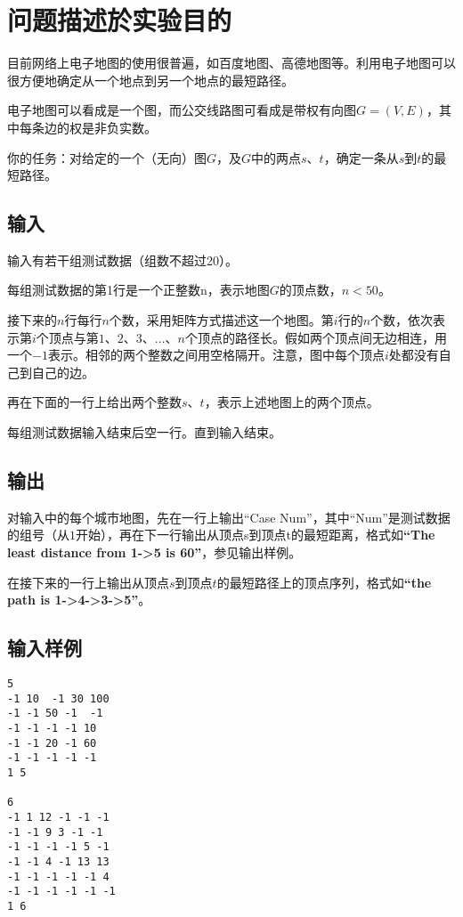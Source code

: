 \documentclass{zjureport}
\begin{document}
\thispagestyle{empty}

\makeCover


\section{问题描述於实验目的}
目前网络上电子地图的使用很普遍，如百度地图、高德地图等。利用电子地图可以很方便地确定从一个地点到另一个地点的最短路径。\par
电子地图可以看成是一个图，而公交线路图可看成是带权有向图$G =(V,E)$，其中每条边的权是非负实数。\par

你的任务：对给定的一个（无向）图$G$，及$G$中的两点$s、t$，确定一条从$s$到$t$的最短路径。\par

\subsection{输入}
输入有若干组测试数据（组数不超过20）。\par
每组测试数据的第1行是一个正整数n，表示地图$G$的顶点数，$n<50$。\par
接下来的$n$行每行$n$个数，采用矩阵方式描述这一个地图。第$i$行的$n$个数，依次表示第$i$个顶点与第$1、2、3、…、n$个顶点的路径长。假如两个顶点间无边相连，用一个$-1$表示。相邻的两个整数之间用空格隔开。注意，图中每个顶点$i$处都没有自己到自己的边。\par
再在下面的一行上给出两个整数$s、t$，表示上述地图上的两个顶点。\par
每组测试数据输入结束后空一行。直到输入结束。\par

\subsection{输出}
对输入中的每个城市地图，先在一行上输出“Case Num”，其中“Num”是测试数据的组号（从$1$开始），再在下一行输出从顶点s到顶点t的最短距离，格式如\textbf{“The least distance from 1->5 is 60”}，参见输出样例。\par
在接下来的一行上输出从顶点$s$到顶点$t$的最短路径上的顶点序列，格式如\textbf{“the path is 1->4->3->5”}。\par


\subsection{输入样例}
\begin{lstlisting}
5
-1 10  -1 30 100
-1 -1 50 -1  -1
-1 -1 -1 -1 10
-1 -1 20 -1 60
-1 -1 -1 -1 -1
1 5

6
-1 1 12 -1 -1 -1
-1 -1 9 3 -1 -1
-1 -1 -1 -1 5 -1
-1 -1 4 -1 13 13
-1 -1 -1 -1 -1 4
-1 -1 -1 -1 -1 -1
1 6
\end{lstlisting}
\end{document}
